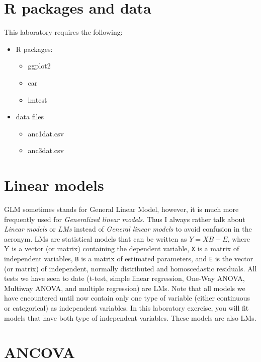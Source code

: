 \documentclass[
  12pt,
]{book}
\providecommand{\tightlist}{%
  \setlength{\itemsep}{0pt}\setlength{\parskip}{0pt}}
\begin{document}
\hypertarget{set-anco}{%
\section{R packages and data}\label{set-anco}}

This laboratory requires the following:

\begin{itemize}
\tightlist
\item
  R packages:

  \begin{itemize}
  \tightlist
  \item
    ggplot2
  \item
    car
  \item
    lmtest
  \end{itemize}
\item
  data files

  \begin{itemize}
  \tightlist
  \item
    anc1dat.csv
  \item
    anc3dat.csv
  \end{itemize}
\end{itemize}

\hypertarget{linear-models}{%
\section{Linear models}\label{linear-models}}

GLM sometimes stands for General Linear Model, however, it is much more frequently used for \emph{Generalized linear models}. Thus I always rather talk about \emph{Linear models} or \emph{LMs} instead of \emph{General linear models} to avoid confusion in the acronym. LMs are statistical models that can be written as \(Y = XB + E\), where Y is a vector (or matrix) containing the dependent variable, \texttt{X} is a matrix of independent variables, \texttt{B} is a matrix of estimated parameters, and \texttt{E} is the vector (or matrix) of independent, normally distributed and homoscedastic residuals. All tests we have seen to date (t-test, simple linear regression, One-Way ANOVA, Multiway ANOVA, and multiple regression) are LMs. Note that all models we have encountered until now contain only one type of variable (either continuous or categorical) as independent variables. In this laboratory exercise, you will fit models that have both type of independent variables. These models are also LMs.

\hypertarget{ancova}{%
\section{ANCOVA}\label{ancova}}
\end{document}

